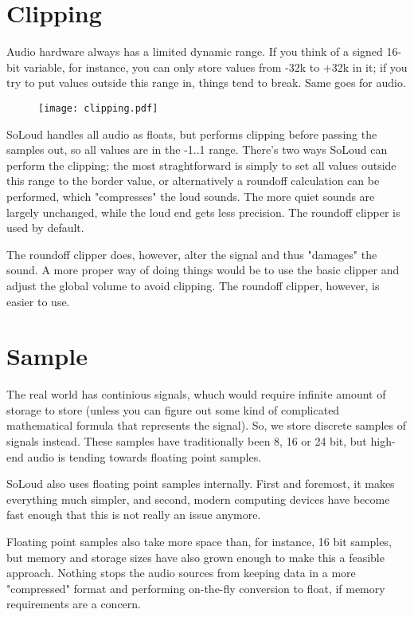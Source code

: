 \section{Clipping}

Audio hardware always has a limited dynamic range. If you think of a signed 16-bit variable, for instance, you can only store values from -32k to +32k in it; if you try to put values outside this range in, things tend to break. Same goes for audio.

\begin{figure}[H]
  \begin{center}
  \texttt{[image: clipping.pdf]}
  \end{center}
\end{figure}
  
SoLoud handles all audio as floats, but performs clipping before passing the samples out, so all values are in the -1..1 range. There's two ways SoLoud can perform the clipping; the most straghtforward is simply to set all values outside this range to the border value, or alternatively a roundoff calculation can be performed, which "compresses" the loud sounds. The more quiet sounds are largely unchanged, while the loud end gets less precision. The roundoff clipper is used by default.

The roundoff clipper does, however, alter the signal and thus "damages" the sound. A more proper way of doing things would be to use the basic clipper and adjust the global volume to avoid clipping. The roundoff clipper, however, is easier to use.

\section{Sample}

The real world has continious signals, whuch would require infinite amount of storage to store (unless you can figure out some kind of complicated mathematical formula that represents the signal). So, we store discrete samples of signals instead. These samples have traditionally been 8, 16 or 24 bit, but high-end audio is tending towards floating point samples.

SoLoud also uses floating point samples internally. First and foremost, it makes everything much simpler, and second, modern computing devices have become fast enough that this is not really an issue anymore.

Floating point samples also take more space than, for instance, 16 bit samples, but memory and storage sizes have also grown enough to make this a feasible approach. Nothing stops the audio sources from keeping data in a more "compressed" format and performing on-the-fly conversion to float, if memory requirements are a concern.

